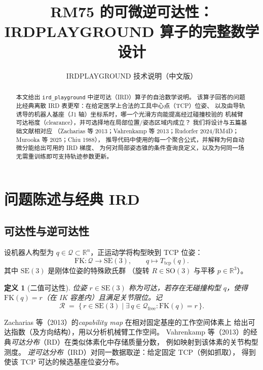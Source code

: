 \documentclass[UTF8,a4paper,11pt,fontset=fandol]{ctexart}
\title{RM75 的可微逆可达性：\\
IRDPLAYGROUND 算子的完整数学设计}
\author{IRDPLAYGROUND 技术说明（中文版）}
\date{}
\newtheorem{definition}{定义}
\newcommand{\SE}{\mathrm{SE}}
\newcommand{\SO}{\mathrm{SO}}
\newcommand{\R}{\mathbb{R}}
\newcommand{\Tcp}{T_{\mathrm{tcp}}}
\begin{document}
\maketitle

\begin{abstract}
本文给出 \texttt{ird\_playground} 中逆可达（IRD）算子的自洽数学说明。
该算子回答的问题比经典离散 IRD 表更窄：在给定医学上合法的工具中心点（TCP）位姿、
以及由导轨诱导的机器人基座（J1 轴）坐标系时，哪一个光滑方向能提高经过碰撞校验的
机械臂可达裕度（clearance），并可选择地在局部位置/姿态区域内成立？
我们将设计与五篇基础文献相对应
（Zacharias 等 2013；Vahrenkamp 等 2013；Rudorfer 2024/RM4D；Murooka 等 2025；Chiu 1988），
推导代码中使用的每一个聚合公式，并解释为何自动微分能给出可用的 IRD 梯度、
为何对局部姿态锥的条件查询良定义，以及为何同一场无需重训练即可支持轨迹参数更新。
\end{abstract}

\tableofcontents
\newpage

\section{问题陈述与经典 IRD}
\label{sec:problem}

\subsection{可达性与逆可达性}
\label{sec:classical}

设机器人构型为 \(q\in\mathcal{Q}\subset\R^{n}\)，正运动学将构型映到 TCP 位姿：
\begin{equation}
\label{eq:fk}
  \mathrm{FK}:\mathcal{Q}\to\SE(3),\qquad
  q\mapsto \Tcp(q).
\end{equation}
其中 \(\SE(3)\) 是刚体位姿的特殊欧氏群
（旋转 \(R\in\SO(3)\) 与平移 \(p\in\R^{3}\)）。

\begin{definition}[二值可达性]
位姿 \(r\in\SE(3)\) 称为\emph{可达}，若存在无碰撞构型 \(q\)，使得
\(\mathrm{FK}(q)=r\)（在 IK 容差内）且满足关节限位。记
\begin{equation}
\label{eq:binary-reach}
  \mathcal{R}
  \;=\;
  \bigl\{\, r\in\SE(3)
  \;\big|\;
  \exists\, q\in\mathcal{Q}_{\mathrm{free}}:
  \mathrm{FK}(q)=r
  \,\bigr\}.
\end{equation}
\end{definition}

Zacharias 等（2013）的\emph{capability map} 在相对固定基座的工作空间体素上
给出可达指数（及方向结构），用以分析机械臂工作空间。
Vahrenkamp 等（2013）的经典\emph{可达分布}（RD）在类似体素化中存储质量分数，
例如映射到该体素的关节构型测度。
\emph{逆可达分布}（IRD）对同一数据取逆：给定固定 TCP（例如抓取），
得到使该 TCP 可达的候选基座位姿分布。
\end{document}
